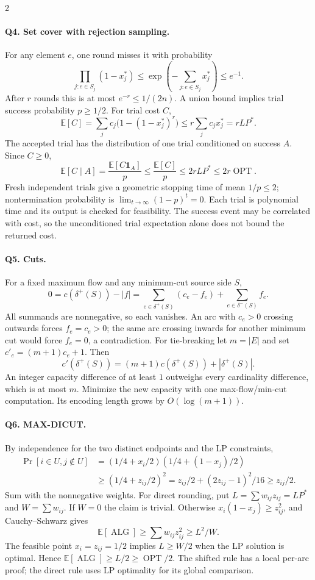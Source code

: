 \documentclass[10pt]{article}
\theoremstyle{definition}
\newcommand{\OPT}{\operatorname{OPT}}
\newcommand{\ALG}{\operatorname{ALG}}
\begin{document}
\begin{multicols*}{2}
\paragraph{Q4. Set cover with rejection sampling.}
For any element $e$, one round misses it with probability
\[
\prod_{j:e\in S_j}(1-x_j^*)
\le \exp\!\left(-\sum_{j:e\in S_j}x_j^*\right)\le e^{-1}.
\]
After $r$ rounds this is at most $e^{-r}\le1/(2n)$.  A union bound implies
trial success probability $p\ge1/2$.  For trial cost $C$,
\[
\mathbb E[C]=\sum_j c_j\bigl(1-(1-x_j^*)^r\bigr)
\le r\sum_j c_jx_j^*=rLP^*.
\]
The accepted trial has the distribution of one trial conditioned on success
$A$.  Since $C\ge0$,
\[
\mathbb E[C\mid A]
=\frac{\mathbb E[C\mathbf1_A]}p
\le\frac{\mathbb E[C]}p\le2rLP^*\le2r\OPT.
\]
Fresh independent trials give a geometric stopping time of mean $1/p\le2$;
nontermination probability is $\lim_{t\to\infty}(1-p)^t=0$.
Each trial is polynomial time and its output is checked for feasibility.
The success event may be correlated with cost, so the unconditioned trial
expectation alone does not bound the returned cost.

\paragraph{Q5. Cuts.}
For a fixed maximum flow and any minimum-cut source side $S$,
\[
0=c(\delta^+(S))-|f|
=\sum_{e\in\delta^+(S)}(c_e-f_e)
 +\sum_{e\in\delta^-(S)}f_e.
\]
All summands are nonnegative, so each vanishes.  An arc with $c_e>0$
crossing outwards forces $f_e=c_e>0$; the same arc crossing inwards for
another minimum cut would force $f_e=0$, a contradiction.
For tie-breaking let $m=|E|$ and set $c'_e=(m+1)c_e+1$.  Then
\[
c'(\delta^+(S))=(m+1)c(\delta^+(S))+|\delta^+(S)|.
\]
An integer capacity difference of at least $1$ outweighs every cardinality
difference, which is at most $m$.  Minimize the new capacity with one
max-flow/min-cut computation.  Its encoding length grows by $O(\log(m+1))$.

\paragraph{Q6. MAX-DICUT.}
By independence for the two distinct endpoints and the LP constraints,
\begin{align*}
\Pr[i\in U,j\notin U]
&=(1/4+x_i/2)(1/4+(1-x_j)/2)\\
&\ge(1/4+z_{ij}/2)^2
=z_{ij}/2+(2z_{ij}-1)^2/16\ge z_{ij}/2.
\end{align*}
Sum with the nonnegative weights.  For direct rounding, put
$L=\sum w_{ij}z_{ij}=LP^*$ and $W=\sum w_{ij}$.  If $W=0$ the claim is
trivial.  Otherwise $x_i(1-x_j)\ge z_{ij}^2$, and Cauchy--Schwarz gives
\[
\mathbb E[\ALG]\ge\sum w_{ij}z_{ij}^2\ge L^2/W.
\]
The feasible point $x_i=z_{ij}=1/2$ implies $L\ge W/2$ when the LP
solution is optimal.  Hence $\mathbb E[\ALG]\ge L/2\ge\OPT/2$.
The shifted rule has a local per-arc proof; the direct rule uses LP
optimality for its global comparison.


\end{multicols*}
\end{document}
